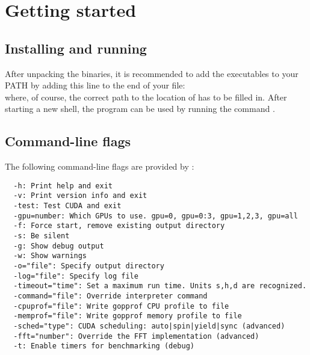 \section{Getting started}

\subsection{Installing and running \mumax}

After unpacking the \mumax binaries, it is recommended to add the \mumax executables to your PATH by adding this line to the end of your  file:\\
 where, of course, the correct path to the location of \mumax has to be filled in.  After starting a new shell, the program can be used by running the command .

\subsection{Command-line flags}

The following command-line flags are provided by \mumax:
\begin{verbatim}
  -h: Print help and exit
  -v: Print version info and exit
  -test: Test CUDA and exit
  -gpu=number: Which GPUs to use. gpu=0, gpu=0:3, gpu=1,2,3, gpu=all
  -f: Force start, remove existing output directory
  -s: Be silent
  -g: Show debug output
  -w: Show warnings
  -o="file": Specify output directory
  -log="file": Specify log file
  -timeout="time": Set a maximum run time. Units s,h,d are recognized.
  -command="file": Override interpreter command
  -cpuprof="file": Write gopprof CPU profile to file
  -memprof="file": Write gopprof memory profile to file
  -sched="type": CUDA scheduling: auto|spin|yield|sync (advanced)
  -fft="number": Override the FFT implementation (advanced)
  -t: Enable timers for benchmarking (debug)
\end{verbatim}




